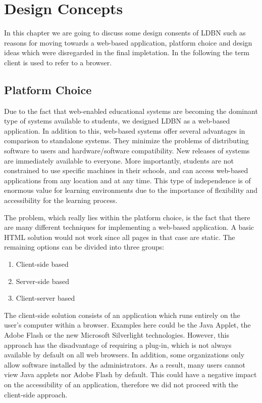 \chapter{Design Concepts}
\label{chap:design}
In this chapter we are going to discuss some design consents of LDBN such as
reasons for moving towards a web-based application, platform choice and 
design ideas which were disregarded in the final impletation. In the following the
term client is used to refer to a browser.

\section{Platform Choice}
Due to the fact that web-enabled educational 
systems are becoming the dominant type of systems 
available to students, we designed LDBN as a web-based application.
In addition to this, web-based systems offer several advantages in comparison to 
standalone systems. They minimize the problems of distributing software to users 
and hardware/software compatibility. New releases of systems are immediately
available to everyone. More importantly, students are not
constrained to use specific machines in their schools, and can access 
web-based applications from any location and at any time. This type of independence 
is of enormous value for learning environments due to the importance of
flexibility and accessibility for the learning process.
 
The problem, which really lies within the platform choice, is the fact that there are
many different techniques for implementing a web-based application. A basic HTML 
solution would not work since all pages in that case are static. The remaining 
options can be divided into three groups:

\begin{enumerate}
	\item Client-side based
	\item Server-side based
	\item Client-server based
\end{enumerate}

The client-side solution consists of an application which runs entirely on the user's 
computer within a browser. Examples here could be the Java Applet, the Adobe Flash or the new 
Microsoft Silverlight technologies. However, this approach has the disadvantage
of requiring a plug-in, which is not always available by default on all web browsers. 
In addition, some organizations only allow software installed by the administrators. 
As a result, many users cannot view Java applets nor Adobe Flash by default. This could 
have a negative impact on the accessibility of an application, 
therefore we did not proceed with the client-side approach.

